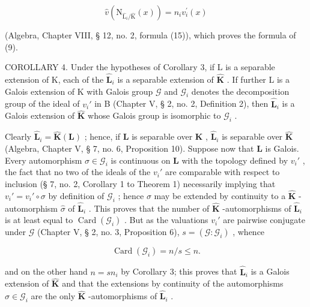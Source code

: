 \[
\hat {v} \left(\mathrm{N} _ {\hat {\mathrm{L}} _ {i} / \hat {\mathrm{K}}} (x)\right) = n _ {i} v _ {i} ^ {\prime} (x)
\]

(Algebra, Chapter VIII, § 12, no. 2, formula (15)), which proves the formula of (9).

COROLLARY 4. Under the hypotheses of Corollary 3, if L is a separable extension of K, each of the \(\hat{\mathbf{L}}_i\) is a separable extension of \(\hat{\mathbf{K}}\) . If further L is a Galois extension of K with Galois group \(\mathcal{G}\) and \(\mathcal{G}_i\) denotes the decomposition group of the ideal of \(v_i'\) in B (Chapter V, § 2, no. 2, Definition 2), then \(\hat{\mathbf{L}}_i\) is a Galois extension of \(\hat{\mathbf{K}}\) whose Galois group is isomorphic to \(\mathcal{G}_i\) .

Clearly \(\hat{\mathbf{L}}_i = \hat{\mathbf{K}}(\mathbf{L})\) ; hence, if \(\mathbf{L}\) is separable over \(\mathbf{K}\) , \(\hat{\mathbf{L}}_i\) is separable over \(\hat{\mathbf{K}}\) (Algebra, Chapter V, § 7, no. 6, Proposition 10). Suppose now that \(\mathbf{L}\) is Galois. Every automorphism \(\sigma \in \mathcal{G}_i\) is continuous on \(\mathbf{L}\) with the topology defined by \(v_i'\) , the fact that no two of the ideals of the \(v_i'\) are comparable with respect to inclusion (§ 7, no. 2, Corollary 1 to Theorem 1) necessarily implying that \(v_i' = v_i' \circ \sigma\) by definition of \(\mathcal{G}_i\) ; hence \(\sigma\) may be extended by continuity to a \(\hat{\mathbf{K}}\) -automorphism \(\hat{\sigma}\) of \(\hat{\mathbf{L}}_i\) . This proves that the number of \(\hat{\mathbf{K}}\) -automorphisms of \(\hat{\mathbf{L}}_i\) is at least equal to \(\operatorname{Card}(\mathcal{G}_i)\) . But as the valuations \(v_i'\) are pairwise conjugate under \(\mathcal{G}\) (Chapter V, § 2, no. 3, Proposition 6), \(s = (\mathcal{G}: \mathcal{G}_i)\) , whence

\[
\operatorname{Card} \left(\mathcal {G} _ {i}\right) = n / s \leqslant n.
\]

and on the other hand \(n = sn_{i}\) by Corollary 3; this proves that \(\hat{\mathbf{L}}_{i}\) is a Galois extension of \(\hat{\mathbf{K}}\) and that the extensions by continuity of the automorphisms \(\sigma \in \mathcal{G}_{i}\) are the only \(\hat{\mathbf{K}}\) -automorphisms of \(\hat{\mathbf{L}}_{i}\) .


